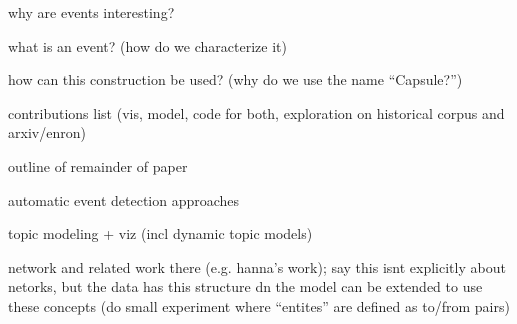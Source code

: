 \PP why are events interesting?

\PP what is an event?  (how do we characterize it)

\PP how can this construction be used? (why do we use the name ``Capsule?'')

\PP contributions list (vis, model, code for both, exploration on historical corpus and arxiv/enron)

\PP outline of remainder of paper


\PP automatic event detection approaches %

\PP topic modeling + viz (incl dynamic topic models)

\PP network and related work there (e.g. hanna's work); say this isnt explicitly about netorks, but the data has this structure dn the model can be extended to use these concepts (do small experiment where ``entites'' are defined as to/from pairs)